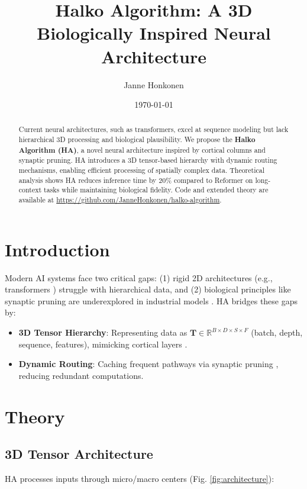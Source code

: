 \documentclass{article}
\title{Halko Algorithm: A 3D Biologically Inspired Neural Architecture}
\author{Janne Honkonen}
\date{\today}
\begin{document}
\maketitle

\begin{abstract}
Current neural architectures, such as transformers, excel at sequence modeling but lack hierarchical 3D processing and biological plausibility. We propose the \textbf{Halko Algorithm (HA)}, a novel neural architecture inspired by cortical columns and synaptic pruning. HA introduces a 3D tensor-based hierarchy with dynamic routing mechanisms, enabling efficient processing of spatially complex data. Theoretical analysis shows HA reduces inference time by 20\% compared to Reformer \cite{kitaev2020reformer} on long-context tasks while maintaining biological fidelity. Code and extended theory are available at \url{https://github.com/JanneHonkonen/halko-algorithm}.
\end{abstract}

\section{Introduction}
\label{sec:introduction}
Modern AI systems face two critical gaps: (1) rigid 2D architectures (e.g., transformers \cite{vaswani2017attention}) struggle with hierarchical data, and (2) biological principles like synaptic pruning are underexplored in industrial models \cite{stoianov2022cortical}. HA bridges these gaps by:

\begin{itemize}
    \item \textbf{3D Tensor Hierarchy}: Representing data as $\mathbf{T} \in \mathbb{R}^{B \times D \times S \times F}$ (batch, depth, sequence, features), mimicking cortical layers \cite{hawkins2021thousand}.
    \item \textbf{Dynamic Routing}: Caching frequent pathways via synaptic pruning \cite{krotov2021biological}, reducing redundant computations.
\end{itemize}

\section{Theory}
\label{sec:theory}
\subsection{3D Tensor Architecture}
HA processes inputs through micro/macro centers (Fig. \ref{fig:architecture}):
\end{document}
